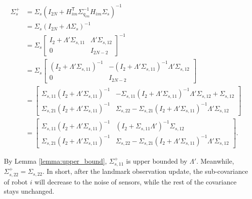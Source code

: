\documentclass[xcolor=x11names]{article}
\DeclareMathOperator\T{\mathsf{T}}
\begin{document}
   \begin{align*}
      \Sigma^{+}_s &= \Sigma_s \left( I_{2N} + H_{im}^{\T} \Sigma_{q_{im}}^{-1} H_{im} \Sigma_s   \right)^{-1}\\
          &= \Sigma_s \left( I_{2N} + \Lambda \Sigma_s   \right)^{-1}\\
          &= \Sigma_s
          \begin{bmatrix} 
            I_2 + \Lambda' \Sigma_{s,11}&  \Lambda' \Sigma_{s,12}\\
            0  & I_{2N-2}
          \end{bmatrix}^{-1} \\
          &= \Sigma_s
          \begin{bmatrix} 
            \left(I_2 + \Lambda' \Sigma_{s,11} \right)^{-1} &  -\left(I_2 + \Lambda' \Sigma_{s,11} \right)^{-1} \Lambda' \Sigma_{s,12}\\
            0  & I_{2N-2}
          \end{bmatrix} \\
          &=
          \begin{bmatrix} 
            \Sigma_{s,11}\left(I_2 + \Lambda' \Sigma_{s,11} \right)^{-1} &  -\Sigma_{s,11}\left(I_2 + \Lambda'\Sigma_{s,11} \right)^{-1} \Lambda' \Sigma_{s,12}+\Sigma_{s,12} \\
            \Sigma_{s,21}\left(I_2 + \Lambda' \Sigma_{s,11} \right)^{-1}  &  \Sigma_{s,22}  -\Sigma_{s,21}\left(I_2 + \Lambda' \Sigma_{s,11} \right)^{-1} \Lambda' \Sigma_{s,12}
          \end{bmatrix} \\
          &=
          \begin{bmatrix} 
            \Sigma_{s,11}\left(I_2 + \Lambda' \Sigma_{s,11} \right)^{-1} &  \left(I_2 + \Sigma_{s,11} \Lambda' \right)^{-1}\Sigma_{s,12} \\
            \Sigma_{s,21}\left(I_2 + \Lambda' \Sigma_{s,11} \right)^{-1}  & \Sigma_{s,22}  -\Sigma_{s,21}\left(I_2 + \Lambda' \Sigma_{s,11} \right)^{-1} \Lambda' \Sigma_{s,12}
          \end{bmatrix}.
   \end{align*}        
   
    By Lemma \ref{lemma:upper_bound}, $\Sigma_{s,11}^+$ is upper bounded by $\Lambda'$. Meanwhile, $\Sigma_{s,22}^+ = \Sigma_{s,22}$.
    In short, after the landmark observation update, the sub-covariance of robot $i$ will decrease to the noise of sensors, while the rest of the covariance stays unchanged.
    
\end{document}
